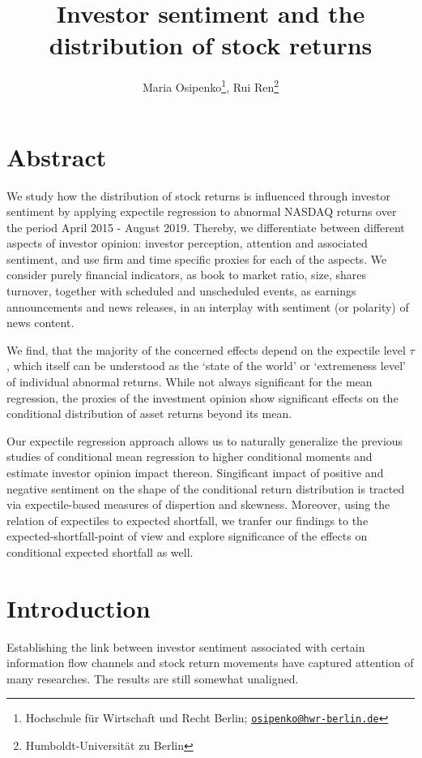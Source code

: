 \documentclass[]{article}
\title{Investor sentiment and the distribution of stock returns}
\author{Maria Osipenko\footnote{Hochschule für Wirtschaft und Recht Berlin; \href{mailto:osipenko@hwr-berlin.de}{\nolinkurl{osipenko@hwr-berlin.de}}}, Rui Ren\footnote{Humboldt-Universität zu Berlin}}
\begin{document}
\maketitle

\hypertarget{abstract}{%
\section*{Abstract}\label{abstract}}

We study how the distribution of stock returns is influenced through investor sentiment by applying expectile regression to abnormal NASDAQ returns over the period April 2015 - August 2019. Thereby, we differentiate between different aspects of investor opinion: investor perception, attention and associated sentiment, and use firm and time specific proxies for each of the aspects. We consider purely financial indicators, as book to market ratio, size, shares turnover, together with scheduled and unscheduled events, as earnings announcements and news releases, in an interplay with sentiment (or polarity) of news content.

We find, that the majority of the concerned effects depend on the expectile level \(\tau\), which itself can be understood as the `state of the world' or `extremeness level' of individual abnormal returns. While not always significant for the mean regression, the proxies of the investment opinion show significant effects on the conditional distribution of asset returns beyond its mean.

Our expectile regression approach allows us to naturally generalize the previous studies of conditional mean regression to higher conditional moments and estimate investor opinion impact thereon. Singificant impact of positive and negative sentiment on the shape of the conditional return distribution is tracted via expectile-based measures of dispertion and skewness. Moreover, using the relation of expectiles to expected shortfall, we tranfer our findings to the expected-shortfall-point of view and explore significance of the effects on conditional expected shortfall as well.


\hypertarget{introduction}{%
\section*{Introduction}\label{introduction}}

Establishing the link between investor sentiment associated with certain information flow channels and stock return movements have captured attention of many researches. The results are still somewhat unaligned.
\end{document}
